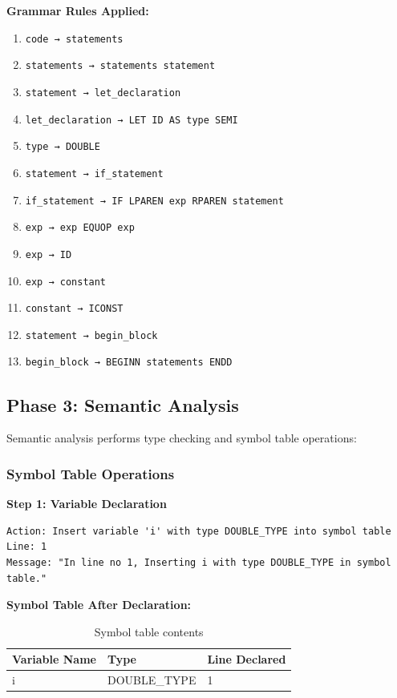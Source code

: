 \documentclass[12pt,a4paper]{article}
\begin{document}
\textbf{Grammar Rules Applied:}
\begin{enumerate}
    \item \texttt{code → statements}
    \item \texttt{statements → statements statement}
    \item \texttt{statement → let\_declaration}
    \item \texttt{let\_declaration → LET ID AS type SEMI}
    \item \texttt{type → DOUBLE}
    \item \texttt{statement → if\_statement}
    \item \texttt{if\_statement → IF LPAREN exp RPAREN statement}
    \item \texttt{exp → exp EQUOP exp}
    \item \texttt{exp → ID}
    \item \texttt{exp → constant}
    \item \texttt{constant → ICONST}
    \item \texttt{statement → begin\_block}
    \item \texttt{begin\_block → BEGINN statements ENDD}
\end{enumerate}

\subsection{Phase 3: Semantic Analysis}

Semantic analysis performs type checking and symbol table operations:

\subsubsection{Symbol Table Operations}

\textbf{Step 1: Variable Declaration}
\begin{verbatim}
Action: Insert variable 'i' with type DOUBLE_TYPE into symbol table
Line: 1
Message: "In line no 1, Inserting i with type DOUBLE_TYPE in symbol table."
\end{verbatim}

\textbf{Symbol Table After Declaration:}
\begin{table}[H]
\centering
\begin{tabular}{|l|l|l|}
\hline
\textbf{Variable Name} & \textbf{Type} & \textbf{Line Declared} \\
\hline
i & DOUBLE\_TYPE & 1 \\
\hline
\end{tabular}
\caption{Symbol table contents}
\end{table}
\end{document}
